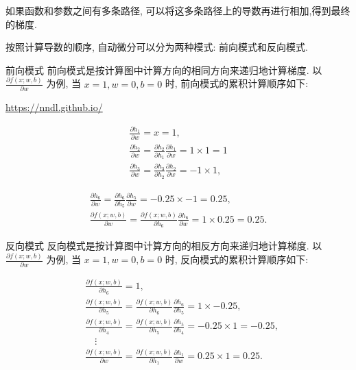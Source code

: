 \documentclass[10pt]{article}
\begin{document}
如果函数和参数之间有多条路径, 可以将这多条路径上的导数再进行相加,得到最终的梯度.

按照计算导数的顺序, 自动微分可以分为两种模式: 前向模式和反向模式.

前向模式 前向模式是按计算图中计算方向的相同方向来递归地计算梯度. 以 $\frac{\partial f(x ; w, b)}{\partial w}$ 为例, 当 $x=1, w=0, b=0$ 时, 前向模式的累积计算顺序如下:

\href{https://nndl.github.io/}{https://nndl.github.io/}


\begin{gather*}
\frac{\partial h_{1}}{\partial w}=x=1,  \tag{4.80}\\
\frac{\partial h_{2}}{\partial w}=\frac{\partial h_{2}}{\partial h_{1}} \frac{\partial h_{1}}{\partial w}=1 \times 1=1  \tag{4.81}\\
\frac{\partial h_{3}}{\partial w}=\frac{\partial h_{3}}{\partial h_{2}} \frac{\partial h_{2}}{\partial w}=-1 \times 1, \tag{4.82}
\end{gather*}


\[
\begin{array}{r}
\frac{\partial h_{6}}{\partial w}=\frac{\partial h_{6}}{\partial h_{5}} \frac{\partial h_{5}}{\partial w}=-0.25 \times-1=0.25, \\
\frac{\partial f(x ; w, b)}{\partial w}=\frac{\partial f(x ; w, b)}{\partial h_{6}} \frac{\partial h_{6}}{\partial w}=1 \times 0.25=0.25 . \tag{4.84}
\end{array}
\]

反向模式 反向模式是按计算图中计算方向的相反方向来递归地计算梯度. 以 $\frac{\partial f(x ; w, b)}{\partial w}$ 为例, 当 $x=1, w=0, b=0$ 时, 反向模式的累积计算顺序如下:


\begin{align*}
& \frac{\partial f(x ; w, b)}{\partial h_{6}}=1,  \tag{4.85}\\
& \frac{\partial f(x ; w, b)}{\partial h_{5}}=\frac{\partial f(x ; w, b)}{\partial h_{6}} \frac{\partial h_{6}}{\partial h_{5}}=1 \times-0.25,  \tag{4.86}\\
& \frac{\partial f(x ; w, b)}{\partial h_{4}}=\frac{\partial f(x ; w, b)}{\partial h_{5}} \frac{\partial h_{5}}{\partial h_{4}}=-0.25 \times 1=-0.25,  \tag{4.87}\\
& \quad \vdots  \tag{4.88}\\
& \frac{\partial f(x ; w, b)}{\partial w}=\frac{\partial f(x ; w, b)}{\partial h_{1}} \frac{\partial h_{1}}{\partial w}=0.25 \times 1=0.25 .
\end{align*}
\end{document}
